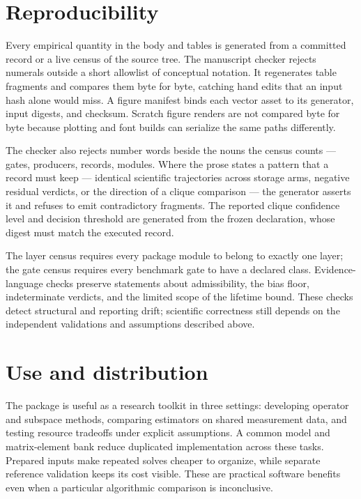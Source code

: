 \documentclass[aps,pra,reprint,superscriptaddress,nofootinbib,floatfix,
  showkeys]{revtex4-2}
\begin{document}
\section{Reproducibility}
\label{sec:reproducibility}

Every empirical quantity in the body and tables is generated from a committed
record or a live census of the source tree. The manuscript checker rejects
numerals outside a short allowlist of conceptual notation. It regenerates
table fragments and compares them byte for byte, catching hand edits that an
input hash alone would miss. A figure manifest binds each vector asset to its
generator, input digests, and checksum. Scratch figure renders are not compared
byte for byte because plotting and font builds can serialize the same paths
differently.

The checker also rejects number words beside the nouns the census counts ---
gates, producers, records, modules. Where the prose states a pattern that a
record must keep --- identical scientific trajectories across storage arms,
negative residual verdicts, or the direction of a clique comparison --- the
generator asserts it and refuses to emit contradictory fragments. The reported
clique confidence level and decision threshold are generated from the frozen
declaration, whose digest must match the executed record.

The layer census requires every package module to belong to exactly one layer;
the gate census requires every benchmark gate to have a declared class.
Evidence-language checks preserve statements about admissibility, the bias
floor, indeterminate verdicts, and the limited scope of the lifetime bound.
These checks detect structural and reporting drift; scientific correctness
still depends on the independent validations and assumptions described above.

\section{Use and distribution}
\label{sec:discussion}

The package is useful as a research toolkit in three settings: developing
operator and subspace methods, comparing estimators on shared measurement data,
and testing resource tradeoffs under explicit assumptions. A common model and
matrix-element bank reduce duplicated implementation across these tasks.
Prepared inputs make repeated solves cheaper to organize, while separate
reference validation keeps its cost visible. These are practical software
benefits even when a particular algorithmic comparison is inconclusive.
\end{document}
